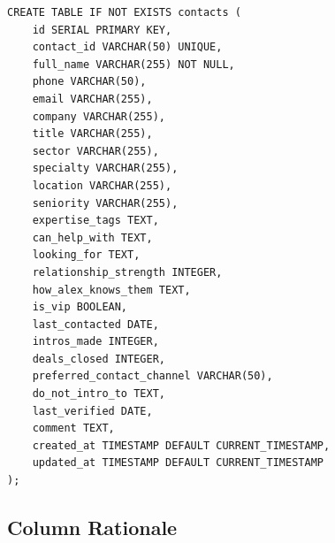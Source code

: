 \documentclass[12pt, a4paper]{report}
\begin{document}
\begin{lstlisting}[style=sqlstyle, caption={Full contacts table schema}]
CREATE TABLE IF NOT EXISTS contacts (
    id SERIAL PRIMARY KEY,
    contact_id VARCHAR(50) UNIQUE,
    full_name VARCHAR(255) NOT NULL,
    phone VARCHAR(50),
    email VARCHAR(255),
    company VARCHAR(255),
    title VARCHAR(255),
    sector VARCHAR(255),
    specialty VARCHAR(255),
    location VARCHAR(255),
    seniority VARCHAR(255),
    expertise_tags TEXT,
    can_help_with TEXT,
    looking_for TEXT,
    relationship_strength INTEGER,
    how_alex_knows_them TEXT,
    is_vip BOOLEAN,
    last_contacted DATE,
    intros_made INTEGER,
    deals_closed INTEGER,
    preferred_contact_channel VARCHAR(50),
    do_not_intro_to TEXT,
    last_verified DATE,
    comment TEXT,
    created_at TIMESTAMP DEFAULT CURRENT_TIMESTAMP,
    updated_at TIMESTAMP DEFAULT CURRENT_TIMESTAMP
);
\end{lstlisting}

\subsection{Column Rationale}
\end{document}
